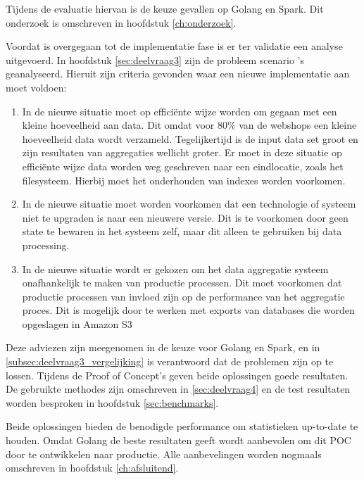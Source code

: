 \clearpage

Tijdens de evaluatie hiervan is de keuze gevallen op Golang en Spark. Dit onderzoek is omschreven in hoofdstuk \ref{ch:onderzoek}.

Voordat is overgegaan tot de implementatie fase is er ter validatie een analyse uitgevoerd. In hoofdstuk \ref{sec:deelvraag3} zijn de probleem scenario 's geanalyseerd. Hieruit zijn criteria gevonden waar een nieuwe implementatie aan moet voldoen:

\begin{enumerate}[label=(\alph*)]
    \item In de nieuwe situatie moet op efficiënte wijze worden om gegaan met een kleine hoeveelheid aan data. Dit omdat voor 80\% van de webshops een kleine hoeveelheid data wordt verzameld. Tegelijkertijd is de input data set groot en zijn resultaten van aggregaties wellicht groter. Er moet in deze situatie op efficiënte wijze data worden weg geschreven naar een eindlocatie,  zoals het filesysteem. Hierbij moet het onderhouden van indexes worden voorkomen.
    
    \item In de nieuwe situatie moet worden voorkomen dat een technologie of systeem niet te upgraden is naar een nieuwere versie. Dit is te voorkomen door geen state te bewaren in het systeem zelf, maar dit alleen te gebruiken bij data processing.
    
    \item In de nieuwe situatie wordt er gekozen om het data aggregatie systeem onafhankelijk te maken van productie processen. Dit moet voorkomen dat productie processen van invloed zijn op de performance van het aggregatie proces. Dit is mogelijk door te werken met exports van databases die worden opgeslagen in Amazon S3
\end{enumerate}

Deze adviezen zijn meegenomen in de keuze voor Golang en Spark, en in \ref{subsec:deelvraag3_vergelijking} is verantwoord dat de problemen zijn op te lossen. Tijdens de Proof of Concept's geven beide oplossingen goede resultaten. De gebruikte methodes zijn omschreven in \ref{sec:deelvraag4} en de test resultaten worden besproken in hoofdstuk \ref{sec:benchmarks}.

Beide oplossingen bieden de benodigde performance om statistieken up-to-date te houden. Omdat Golang de beste resultaten geeft wordt aanbevolen om dit POC door te ontwikkelen naar productie. Alle aanbevelingen worden nogmaals omschreven in hoofdstuk \ref{ch:afsluitend}.